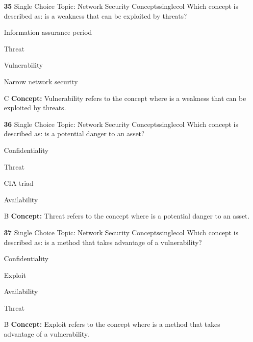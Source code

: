 \documentclass[10pt,a4paper]{article}
\begin{document}
\begin{qcard}{\color{white}\textbf{35} \hfill \small Single Choice \textbar{} Topic: Network Security Concepts}{singlecol}
Which concept is described as: is a weakness that can be exploited by threats?

\begin{qoptions}
\item Information assurance period
\item Threat
\item Vulnerability
\item Narrow network security
\end{qoptions}
\begin{explainbox}{C}
\textbf{Concept:} Vulnerability refers to the concept where is a weakness that can be exploited by threats.
\end{explainbox}
\end{qcard}

\begin{qcard}{\color{white}\textbf{36} \hfill \small Single Choice \textbar{} Topic: Network Security Concepts}{singlecol}
Which concept is described as: is a potential danger to an asset?

\begin{qoptions}
\item Confidentiality
\item Threat
\item CIA triad
\item Availability
\end{qoptions}
\begin{explainbox}{B}
\textbf{Concept:} Threat refers to the concept where is a potential danger to an asset.
\end{explainbox}
\end{qcard}

\begin{qcard}{\color{white}\textbf{37} \hfill \small Single Choice \textbar{} Topic: Network Security Concepts}{singlecol}
Which concept is described as: is a method that takes advantage of a vulnerability?

\begin{qoptions}
\item Confidentiality
\item Exploit
\item Availability
\item Threat
\end{qoptions}
\begin{explainbox}{B}
\textbf{Concept:} Exploit refers to the concept where is a method that takes advantage of a vulnerability.
\end{explainbox}
\end{qcard}
\end{document}
